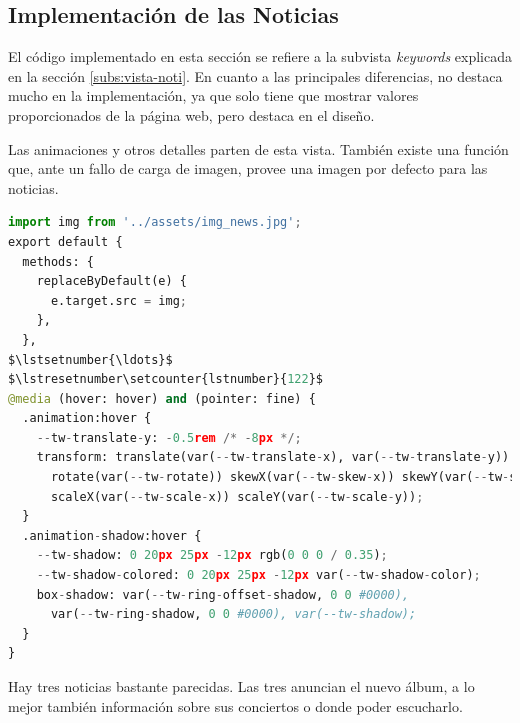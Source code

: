 \subsection{Implementación de las Noticias}
El código implementado en esta sección se refiere a la subvista \textit{keywords} explicada en la sección \ref{subs:vista-noti}. En cuanto a las principales diferencias, no destaca mucho en la implementación, ya que solo tiene que mostrar valores proporcionados de la página web, pero destaca en el diseño.

\vspace{0.3cm}

Las animaciones y otros detalles parten de esta vista. También existe una función que, ante un fallo de carga de imagen, provee una imagen por defecto para las noticias.


\vspace{0.3cm}

\begin{lstlisting}[caption=Diferencias destacables de la implementación de las noticas,language=Python, mathescape=true]
import img from '../assets/img_news.jpg';
export default {
  methods: {
    replaceByDefault(e) {
      e.target.src = img;
    },
  },
$\lstsetnumber{\ldots}$
$\lstresetnumber\setcounter{lstnumber}{122}$
@media (hover: hover) and (pointer: fine) {
  .animation:hover {
    --tw-translate-y: -0.5rem /* -8px */;
    transform: translate(var(--tw-translate-x), var(--tw-translate-y))
      rotate(var(--tw-rotate)) skewX(var(--tw-skew-x)) skewY(var(--tw-skew-y))
      scaleX(var(--tw-scale-x)) scaleY(var(--tw-scale-y));
  }
  .animation-shadow:hover {
    --tw-shadow: 0 20px 25px -12px rgb(0 0 0 / 0.35);
    --tw-shadow-colored: 0 20px 25px -12px var(--tw-shadow-color);
    box-shadow: var(--tw-ring-offset-shadow, 0 0 #0000),
      var(--tw-ring-shadow, 0 0 #0000), var(--tw-shadow);
  }
}
\end{lstlisting}

Hay tres noticias bastante parecidas. Las tres anuncian el nuevo álbum, a lo mejor también información sobre sus conciertos o donde poder escucharlo.

